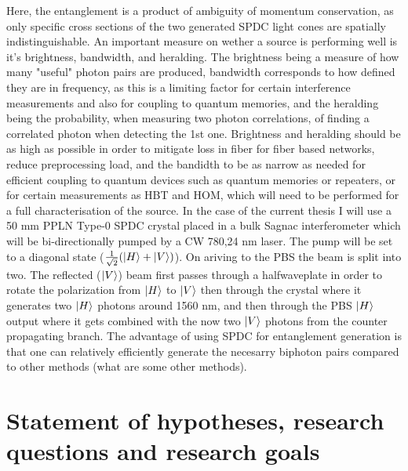 \documentclass{article}
\theoremstyle{mytheoremstyle}
\theoremstyle{mytheoremstyle}
\theoremstyle{myproblemstyle}
\begin{document}
Here, the entanglement is a product of ambiguity of momentum conservation, as only specific cross sections of the two generated SPDC light cones are spatially indistinguishable.
An important measure on wether a source is performing well is it's brightness, bandwidth, and heralding. The brightness being a measure of how many "useful" photon pairs are produced,
bandwidth corresponds to how defined they are in frequency, as this is a limiting factor for certain interference measurements and also for coupling
to quantum memories, and the heralding being the probability, when measuring two photon correlations,
of finding a correlated photon when detecting the 1st one.
Brightness and heralding should be as high as possible in order to mitigate loss in fiber for fiber based networks,
reduce preprocessing load, and the bandidth to be as narrow as needed for efficient coupling to quantum devices such as quantum memories or repeaters, 
or for certain measurements as HBT and HOM, which will need to be performed for a full characterisation of the source.
In the case of the current thesis I will use a 50 mm PPLN Type-0 SPDC crystal placed in a bulk Sagnac interferometer which will be bi-directionally 
pumped by a CW 780,24 nm laser. The pump will be set to a diagonal state ($\frac{1}{\sqrt{2}}(\ket{H} + \ket{V})$). On ariving to the 
PBS the beam is split into two. The reflected ($\ket{V}$) beam first passes through a halfwaveplate in order to rotate the polarization from $\ket{H}$ to $\ket{V}$
then through the crystal where it generates two $\ket{H}$ photons around 1560 nm, and then through the PBS $\ket{H}$ output where it gets combined 
with the now two $\ket{V}$ photons from the counter propagating branch.
The advantage of using SPDC for entanglement generation is that one can relatively efficiently generate the necesarry biphoton pairs 
compared to other methods (what are some other methods).

\section{Statement of hypotheses, research questions and research goals}
\end{document}
